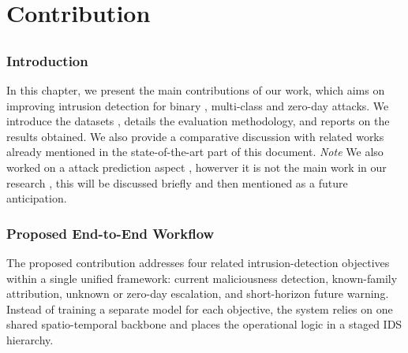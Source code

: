 \documentclass[12pt, a4paper]{report}
\begin{document}



\part{Contribution}
\chapter{}

\section{Introduction}

In this chapter, we present the main contributions of our work, which aims on improving intrusion
detection for binary , multi-class and zero-day attacks. 
 We introduce the datasets , details the evaluation 
 methodology, and reports on the results obtained. 
 We also provide a comparative discussion
with related works already mentioned in the state-of-the-art part of this document.
\textit{Note} We also worked on a attack prediction aspect , howerver it is not the main 
work in our research , this will be discussed briefly and then mentioned as a future anticipation.


\section{Proposed End-to-End Workflow}

The proposed contribution addresses four related intrusion-detection objectives within a single unified framework: current maliciousness detection, known-family attribution, unknown or zero-day escalation, and short-horizon future warning. Instead of training a separate model for each objective, the system relies on one shared spatio-temporal backbone and places the operational logic in a staged IDS hierarchy.
\end{document}
